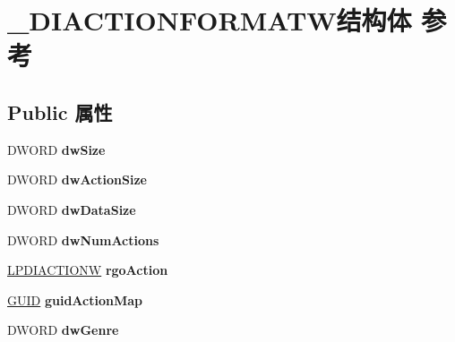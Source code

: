 \hypertarget{struct___d_i_a_c_t_i_o_n_f_o_r_m_a_t_w}{}\section{\+\_\+\+D\+I\+A\+C\+T\+I\+O\+N\+F\+O\+R\+M\+A\+T\+W结构体 参考}
\label{struct___d_i_a_c_t_i_o_n_f_o_r_m_a_t_w}
\subsection*{Public 属性}
\begin{DoxyCompactItemize}
\item 
\mbox{\label{struct___d_i_a_c_t_i_o_n_f_o_r_m_a_t_w_a57d725bf5b4f4eca4b507abd512e42ea}} 
D\+W\+O\+RD {\bfseries dw\+Size}
\item 
\mbox{\label{struct___d_i_a_c_t_i_o_n_f_o_r_m_a_t_w_a6e88754a8445e8d3fa25151c7f5f2d0b}} 
D\+W\+O\+RD {\bfseries dw\+Action\+Size}
\item 
\mbox{\label{struct___d_i_a_c_t_i_o_n_f_o_r_m_a_t_w_aade5e9d6c4bfeafdfee2e73cc196b948}} 
D\+W\+O\+RD {\bfseries dw\+Data\+Size}
\item 
\mbox{\label{struct___d_i_a_c_t_i_o_n_f_o_r_m_a_t_w_a9077c247d953a9918018b1c7a956f932}} 
D\+W\+O\+RD {\bfseries dw\+Num\+Actions}
\item 
\mbox{\label{struct___d_i_a_c_t_i_o_n_f_o_r_m_a_t_w_a485c0753b8c3bdb1ce1f1bc5f1222036}} 
\hyperlink{struct___d_i_a_c_t_i_o_n_w}{L\+P\+D\+I\+A\+C\+T\+I\+O\+NW} {\bfseries rgo\+Action}
\item 
\mbox{\label{struct___d_i_a_c_t_i_o_n_f_o_r_m_a_t_w_ababfc75194f2ea9bf6bc082b61fc7e38}} 
\hyperlink{interface_g_u_i_d}{G\+U\+ID} {\bfseries guid\+Action\+Map}
\item 
\mbox{\label{struct___d_i_a_c_t_i_o_n_f_o_r_m_a_t_w_af2215c245b2bf5029cab678829df3fb4}} 
D\+W\+O\+RD {\bfseries dw\+Genre}

\end{DoxyCompactItemize}
